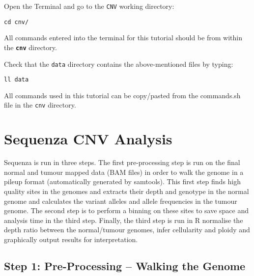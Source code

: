 \begin{steps}
Open the Terminal and go to the \texttt{CNV} working directory:
\begin{lstlisting}
cd cnv/
\end{lstlisting}
\end{steps}

\begin{warning}
  All commands entered into the terminal for this tutorial should be from within the
  \textbf{\texttt{cnv}} directory.
\end{warning}

\begin{steps}
Check that the \texttt{data} directory contains the above-mentioned files by typing:
\begin{lstlisting}
ll data
\end{lstlisting}
\end{steps}

All commands used in this tutorial can be copy/pasted from the commands.sh file in the \texttt{cnv} directory.


\section{Sequenza CNV Analysis}

Sequenza is run in three steps. The first pre-processing step is run on the final normal and tumour mapped data (BAM files) in order to walk the genome in a pileup format (automatically generated by samtools). This first step finds high quality sites in the genomes and extracts their depth and genotype in the normal genome and calculates the variant alleles and allele frequencies in the tumour genome. The second step is to perform a binning on these sites to save space and analysis time in the third step. Finally, the third step is run in R normalise the depth ratio between the normal/tumour genomes, infer cellularity and ploidy and graphically output results for interpretation.


\subsection{Step 1: Pre-Processing -- Walking the Genome}

